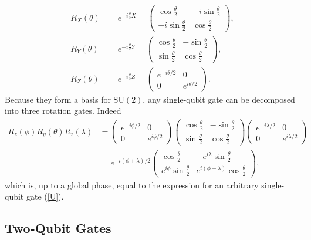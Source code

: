 \documentclass[10pt]{article}
\begin{document}
\begin{align}
R_X(\theta)
&=
e^{-i\frac{\theta}{2}X}
=
\begin{pmatrix}
\cos\frac{\theta}{2} & -i\sin\frac{\theta}{2} \\
-i\sin\frac{\theta}{2} & \cos\frac{\theta}{2} 
\end{pmatrix},
\\
R_Y(\theta)
&=
e^{-i\frac{\theta}{2}Y}
=
\begin{pmatrix}
\cos\frac{\theta}{2} & -\sin\frac{\theta}{2} \\
\sin\frac{\theta}{2} & \cos\frac{\theta}{2} 
\end{pmatrix},
\\
R_Z(\theta)
&=
e^{-i\frac{\theta}{2}Z}
=
\begin{pmatrix}
e^{-i\theta/2} & 0 \\
0 & e^{i\theta/2}
\end{pmatrix}
.\end{align}
Because they form a basis for $\text{SU}(2)$, any single-qubit gate can be decomposed into three rotation gates. Indeed
\begin{align}
R_z(\phi)R_y(\theta)R_z(\lambda)
&=
\begin{pmatrix}
e^{-i\phi/2} & 0 \\
0 & e^{i\phi/2}
\end{pmatrix}
\begin{pmatrix}
\cos\frac{\theta}{2} & -\sin\frac{\theta}{2} \\
\sin\frac{\theta}{2} & \cos\frac{\theta}{2} 
\end{pmatrix}
\begin{pmatrix}
e^{-i\lambda/2} & 0 \\
0 & e^{i\lambda/2}
\end{pmatrix}
\\
&=
e^{-i(\phi+\lambda)/2}
\begin{pmatrix}
\cos\frac{\theta}{2} & -e^{i\lambda}\sin\frac{\theta}{2}
\\
e^{i\phi}\sin\frac{\theta}{2} & e^{i(\phi+\lambda)}\cos\frac{\theta}{2}
\end{pmatrix}
,\end{align}
which is, up to a global phase, equal to the expression for an arbitrary single-qubit gate (\ref{U}).

\subsection{Two-Qubit Gates}
\end{document}
